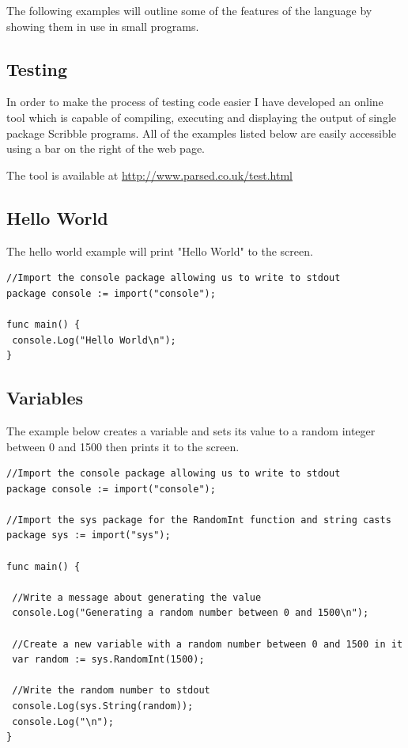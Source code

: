 \documentclass[]{final_report}
\begin{document}
The following examples will outline some of the features of the language by showing them in use in small programs.

\subsection{Testing}

In order to make the process of testing code easier I have developed an online tool which is capable of compiling, executing and displaying the output of single package Scribble programs. All of the examples listed below are easily accessible using a bar on the right of the web page.

The tool is available at \url{http://www.parsed.co.uk/test.html}

\subsection{Hello World}

The hello world example will print "Hello World" to the screen.

\begin{verbatim}
//Import the console package allowing us to write to stdout
package console := import("console");

func main() {
 console.Log("Hello World\n");
}
\end{verbatim}

\subsection{Variables}

The example below creates a variable and sets its value to a random integer between 0 and 1500 then prints it to the screen.

\begin{verbatim}
//Import the console package allowing us to write to stdout
package console := import("console");

//Import the sys package for the RandomInt function and string casts
package sys := import("sys");

func main() {

 //Write a message about generating the value
 console.Log("Generating a random number between 0 and 1500\n");
 
 //Create a new variable with a random number between 0 and 1500 in it
 var random := sys.RandomInt(1500);
 
 //Write the random number to stdout
 console.Log(sys.String(random));
 console.Log("\n");
}
\end{verbatim}
\end{document}
